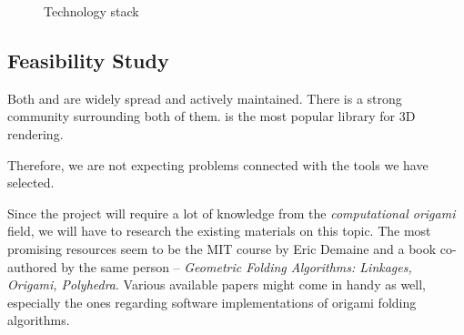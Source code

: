 \begin{figure}[H]
	\caption{Technology stack}
	\centering
\end{figure}


\subsection{Feasibility Study}

Both  and  are widely spread and actively maintained.
There is a strong community surrounding both of them.
 is the most popular library for 3D  rendering.

Therefore, we are not expecting problems connected with the tools we have selected.

Since the project will require a lot of knowledge from the \textit{computational origami}
field, we will have to research the existing materials on this topic.
The most promising resources seem to be the MIT course by
Eric Demaine\cite{mit-course} and a book co-authored by the same person -- \textit{Geometric Folding Algorithms: Linkages, Origami, Polyhedra}\cite{origami-book}.
Various available papers might come in handy as well, especially the ones regarding software implementations of origami folding algorithms.


